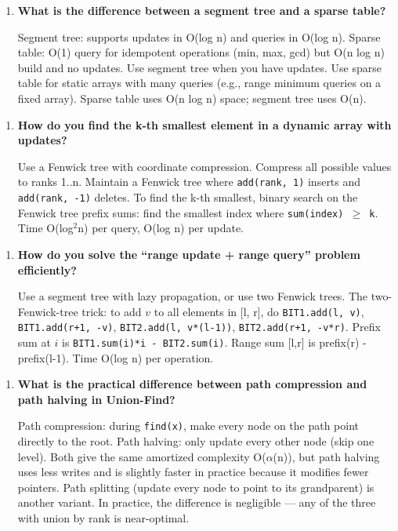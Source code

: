 \begin{enumerate}
\item \textbf{What is the difference between a segment tree and a sparse table?}

Segment tree: supports updates in O(log n) and queries in O(log n). Sparse table: O(1) query for idempotent operations (min, max, gcd) but O(n log n) build and no updates. Use segment tree when you have updates. Use sparse table for static arrays with many queries (e.g., range minimum queries on a fixed array). Sparse table uses O(n log n) space; segment tree uses O(n).
\end{enumerate}

\begin{enumerate}
\item \textbf{How do you find the k-th smallest element in a dynamic array with updates?}

Use a Fenwick tree with coordinate compression. Compress all possible values to ranks 1..n. Maintain a Fenwick tree where \texttt{add(rank, 1)} inserts and \texttt{add(rank, -1)} deletes. To find the k-th smallest, binary search on the Fenwick tree prefix sums: find the smallest index where \texttt{sum(index) $\geq$ k}. Time O(log$^{2}$n) per query, O(log n) per update.
\end{enumerate}

\begin{enumerate}
\item \textbf{How do you solve the ``range update + range query'' problem efficiently?}

Use a segment tree with lazy propagation, or use two Fenwick trees. The two-Fenwick-tree trick: to add $v$ to all elements in [l, r], do \texttt{BIT1.add(l, v)}, \texttt{BIT1.add(r+1, -v)}, \texttt{BIT2.add(l, v*(l-1))}, \texttt{BIT2.add(r+1, -v*r)}. Prefix sum at $i$ is \texttt{BIT1.sum(i)*i - BIT2.sum(i)}. Range sum [l,r] is prefix(r) - prefix(l-1). Time O(log n) per operation.
\end{enumerate}

\begin{enumerate}
\item \textbf{What is the practical difference between path compression and path halving in Union-Find?}

Path compression: during \texttt{find(x)}, make every node on the path point directly to the root. Path halving: only update every other node (skip one level). Both give the same amortized complexity O($\alpha$(n)), but path halving uses less writes and is slightly faster in practice because it modifies fewer pointers. Path splitting (update every node to point to its grandparent) is another variant. In practice, the difference is negligible — any of the three with union by rank is near-optimal.
\end{enumerate}

